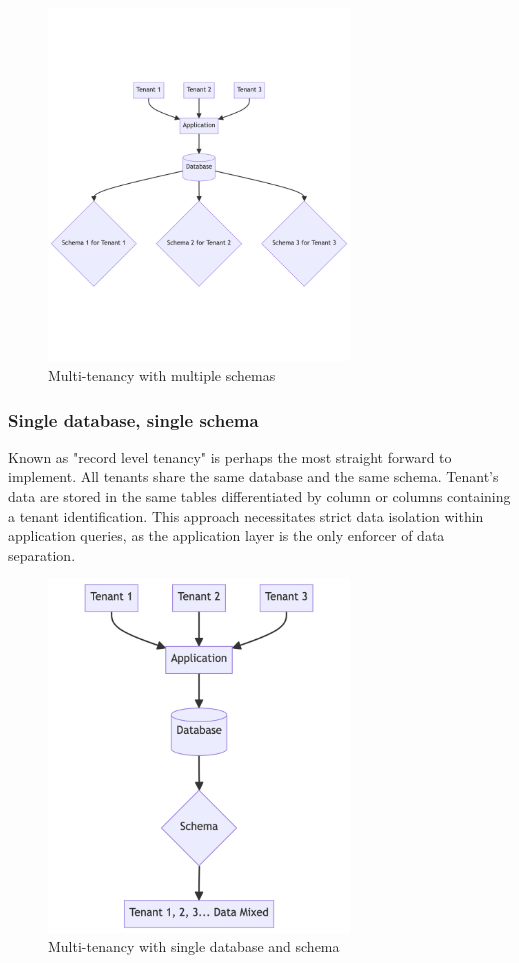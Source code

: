 \begin{figure}[p]\centering
\includegraphics[width=80mm]{img/chap04/fig_multitenancy_multiple_schemas.png}
\caption{Multi-tenancy with multiple schemas}
\label{img04:multitenancy-multiple-schemas}
\end{figure}


\subsubsection{Single database, single schema}
\label{subsubsec:single-database-single-schema}
Known as "record level tenancy" is perhaps the most straight forward to implement.
All tenants share the same database and the same schema.
Tenant's data are stored in the same tables differentiated by column or columns containing a tenant identification.
This approach necessitates strict data isolation within application queries, as the application layer is the only enforcer of data separation.

\begin{figure}[p]\centering
\includegraphics[width=80mm]{img/chap04/fig_multitenancy_single_database_single_schema.png}
\caption{Multi-tenancy with single database and schema}
\label{img04:multitenancy-single-database-single-schema}
\end{figure}


